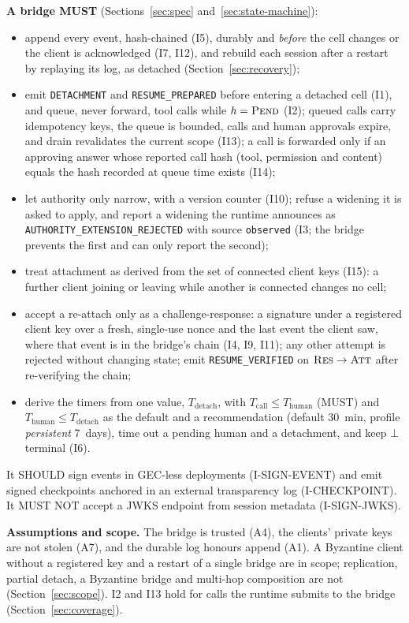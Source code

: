 \smallskip\noindent\textbf{A bridge MUST} (Sections~\ref{sec:spec}
and~\ref{sec:state-machine}):
\begin{itemize}[leftmargin=1.5em,itemsep=0pt,topsep=2pt]
\item append every event, hash-chained (I5), durably and \emph{before}
the cell changes or the client is acknowledged (I7, I12), and rebuild each
session after a restart by replaying its log, as detached
(Section~\ref{sec:recovery});
\item emit \texttt{DETACHMENT} and \texttt{RESUME\_PREPARED} before
entering a detached cell (I1), and queue, never forward, tool calls while
$h=\textsc{Pend}$ (I2); queued calls carry idempotency keys, the queue
is bounded, calls and human approvals expire, and drain revalidates the
current scope (I13); a call is forwarded only if an approving answer
whose reported call hash (tool, permission and content) equals the hash recorded at queue time
exists (I14);
\item let authority only narrow, with a version counter (I10); refuse a
widening it is asked to apply, and report a widening the runtime
announces as \texttt{AUTHORITY\_EXTENSION\_REJECTED} with source
\texttt{observed} (I3; the bridge prevents the first and can only report the
second);
\item treat attachment as derived from the set of connected client keys
(I15): a further client joining or leaving while another is connected
changes no cell;
\item accept a re-attach only as a challenge-response: a signature under a
registered client key over a fresh, single-use nonce
and the last event the client saw, where that event is in the bridge's
chain (I4, I9, I11); any other attempt is rejected without changing state;
emit \texttt{RESUME\_VERIFIED} on $\textsc{Res}\to\textsc{Att}$ after
re-verifying the chain;
\item derive the timers from one value, $T_{\text{detach}}$, with
$T_{\text{call}} \le T_{\text{human}}$ (MUST) and
$T_{\text{human}} \le T_{\text{detach}}$ as the default and a recommendation
(default 30~min, profile \emph{persistent} 7~days),
time out a pending human and a detachment, and keep $\bot$ terminal (I6).
\end{itemize}
It SHOULD sign events in GEC-less deployments (I-SIGN-EVENT) and emit
signed checkpoints anchored in an external transparency log
(I-CHECKPOINT). It MUST NOT accept a JWKS endpoint from session metadata
(I-SIGN-JWKS).

\smallskip\noindent\textbf{Assumptions and scope.} The bridge is
trusted (A4), the clients' private keys are not stolen (A7), and the
durable log honours append (A1). A Byzantine client without a registered
key and a restart of a single bridge are in scope; replication, partial
detach, a Byzantine bridge and multi-hop composition are not
(Section~\ref{sec:scope}). I2 and I13 hold for calls the runtime submits
to the bridge (Section~\ref{sec:coverage}).

